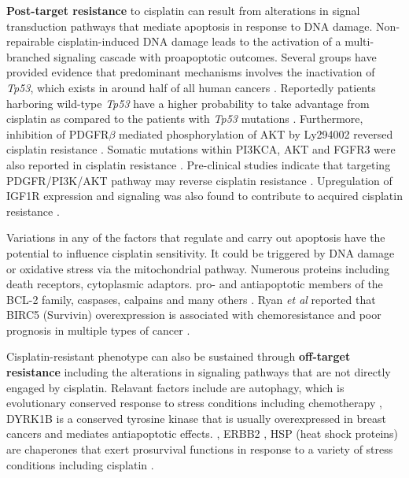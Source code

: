 
\textbf{Post-target resistance} to cisplatin can result from alterations in signal transduction pathways that mediate apoptosis in response to DNA damage. Non-repairable cisplatin-induced DNA damage leads to the activation of a multi-branched signaling cascade with proapoptotic outcomes. Several groups have provided evidence that predominant mechanisms involves the inactivation of \textit{Tp53}, which exists in around half of all human cancers \cite{kirsch1998tumor}. Reportedly patients harboring wild-type \textit{Tp53} have a higher probability to take advantage from cisplatin as compared to the patients with \textit{Tp53} mutations \cite{vousden2007p53,gadducci2002molecular}. 
Furthermore, inhibition of PDGFR$\beta$ mediated phosphorylation of AKT by Ly294002 reversed cisplatin resistance \cite{juliachs2014pdgfrbeta}. Somatic mutations within PI3KCA, AKT and FGFR3 were also reported in cisplatin resistance \cite{feldman2014presence}. Pre-clinical studies indicate that targeting PDGFR/PI3K/AKT pathway may reverse cisplatin resistance \cite{juliachs2013effectivity}.
Upregulation of IGF1R expression and signaling was also found to contribute to acquired cisplatin resistance \cite{selfe2018igf1r}. 

Variations in any of the factors that regulate and carry out apoptosis have the potential to influence cisplatin sensitivity. It could be triggered by DNA damage or oxidative stress via the mitochondrial pathway. Numerous proteins including death receptors, cytoplasmic adaptors. pro- and antiapoptotic members of the BCL-2 family, caspases, calpains and many others \cite{jain2011molecular, janson2010resistance, michaud2009bcl}. Ryan \textit{et al} reported that BIRC5 (Survivin) overexpression is associated with chemoresistance and poor prognosis in multiple types of cancer \cite{ryan2009survivin}. 

Cisplatin-resistant phenotype can also be sustained through \textbf{off-target resistance} including the alterations in signaling pathways that are not directly engaged by cisplatin. Relavant factors include are autophagy, which is evolutionary conserved response to stress conditions including chemotherapy \cite{tan2019trp14}, DYRK1B is a conserved tyrosine kinase that is usually overexpressed in breast cancers and mediates antiapoptotic effects.  \cite{hu2010depleting}, ERBB2 \cite{fijolek2006p53}, HSP (heat shock proteins)  are chaperones that exert prosurvival functions in response to a variety of stress conditions including cisplatin \cite{ren2008down}. 

